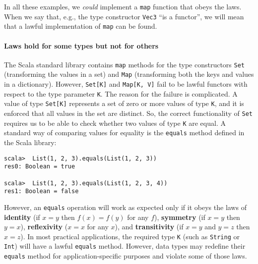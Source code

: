 In all these examples, we \emph{could} implement a \lstinline!map!
function that obeys the laws. When we say that, e.g., the type constructor
\lstinline!Vec3! \textsf{``}is a functor\textsf{''}, we will mean that a lawful
implementation of \lstinline!map! can be found.

\paragraph{Laws hold for some types but not for others}

The Scala standard library contains \lstinline!map! methods for the
type constructors \lstinline!Set! (transforming the values in a set)
and \lstinline!Map! (transforming both the keys and values in a dictionary).
However, \lstinline!Set[K]! and \lstinline!Map[K, V]! fail to be
lawful functors with respect to the type parameter \lstinline!K!.
The reason for the failure is complicated. A value of type \lstinline!Set[K]!
represents a set of zero or more values of type \lstinline!K!, and
it is enforced that all values in the set are distinct. So, the correct
functionality of \lstinline!Set! requires us to be able to\emph{
}check whether two values of type \lstinline!K! are equal. A standard
way of comparing values for equality is the \lstinline!equals! method
defined in the Scala library:
\begin{lstlisting}
scala>  List(1, 2, 3).equals(List(1, 2, 3))
res0: Boolean = true

scala>  List(1, 2, 3).equals(List(1, 2, 3, 4))
res1: Boolean = false
\end{lstlisting}
However, an \lstinline!equals! operation will work as expected only
if it obeys the \label{par:label-equality-laws}laws of \textbf{identity}
(if $x=y$ then $f(x)=f(y)$ for any $f$), \textbf{symmetry} (if
$x=y$ then $y=x$), \textbf{reflexivity}
($x=x$ for any $x$), and \textbf{transitivity}
(if $x=y$ and $y=z$ then $x=z$). In most practical applications,
the required type \lstinline!K! (such as \lstinline!String! or \lstinline!Int!)
will have a lawful \lstinline!equals! method. However, data types
may redefine their \lstinline!equals! method for application-specific
purposes and violate some of those laws.

